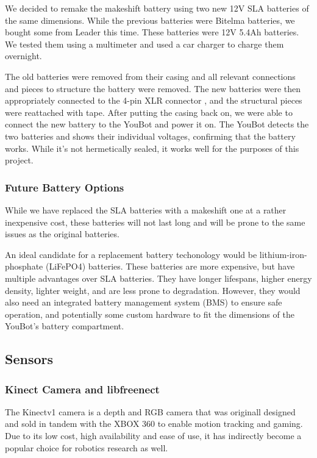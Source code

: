 \documentclass[a4paper, 12pt]{article}
\newif\ifshownotes
\newcommand{\notes}[1]{\ifshownotes\textcolor{blue}{#1}\fi}
\begin{document}
    We decided to remake the makeshift battery using two new 12V SLA batteries of the same dimensions. While the previous batteries were Bitelma batteries, we bought some from Leader this time. These batteries were 12V 5.4Ah batteries. We tested them using a multimeter and used a car charger to charge them overnight. 
    
    The old batteries were removed from their casing and all relevant connections and pieces to structure the battery were removed. The new batteries were then appropriately connected to the 4-pin XLR connector \notes{maybe mention the pinout here?}, and the structural pieces were reattached with tape. After putting the casing back on, we were able to connect the new battery to the YouBot and power it on. The YouBot detects the two batteries and shows their individual voltages, confirming that the battery works. While it's not hermetically sealed, it works well for the purposes of this project. 

    \subsubsection{Future Battery Options}

    While we have replaced the SLA batteries with a makeshift one at a rather inexpensive cost, these batteries will not last long and will be prone to the same issues as the original batteries. 

    An ideal candidate for a replacement battery techonology would be lithium-iron-phosphate (LiFePO4) batteries. These batteries are more expensive, but have multiple advantages over SLA batteries. They have longer lifespans, higher energy density, lighter weight, and are less prone to degradation. However, they would also need an integrated battery management system (BMS) to ensure safe operation, and potentially some custom hardware to fit the dimensions of the YouBot's battery compartment. 


    
    \subsection{Sensors}
    \subsubsection{Kinect Camera and libfreenect}

    The Kinectv1 camera is a depth and RGB camera that was originall designed and sold in tandem with the XBOX 360 to enable motion tracking and gaming. Due to its low cost, high availability and ease of use, it has indirectly become a popular choice for robotics research as well. 
\end{document}
